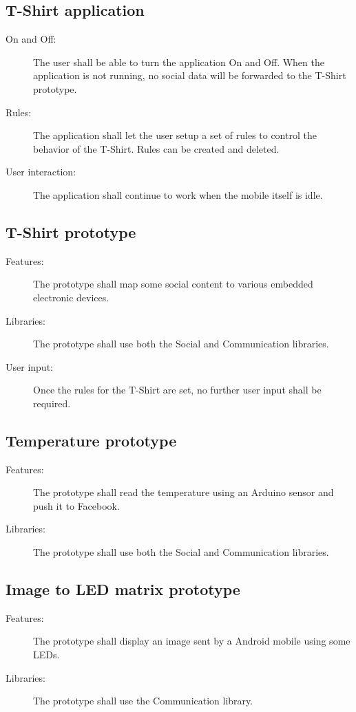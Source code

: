 	\subsection{T-Shirt application}
	
	\begin{description}
		\item[On and Off:] The user shall be able to turn the application On and Off.
		When the application is not running, no social data will be forwarded
		to the T-Shirt prototype.
		\item[Rules:] The application shall let the user setup a set of rules
		to control the behavior of the T-Shirt. Rules can be created and deleted.
		\item[User interaction:] The application shall continue to work
		when the mobile itself is idle.
	\end{description}

	\newpage

	\subsection{T-Shirt prototype}

	\begin{description}
		\item[Features:] The prototype shall map some social content
		to various embedded electronic devices.
		\item[Libraries:] The prototype shall use both the Social and
		Communication libraries.
		\item[User input:] Once the rules for the T-Shirt are set,
		no further user input shall be required.
	\end{description}

	\subsection{Temperature prototype}
	\begin{description}
		\item[Features:] The prototype shall read the temperature
		using an Arduino sensor and push it to Facebook.
		\item[Libraries:] The prototype shall use both the Social and
		Communication libraries.
		\item[]
	\end{description}
	
	\subsection{Image to LED matrix prototype}
	\begin{description}
		\item[Features:] The prototype shall display an image sent by a Android
		mobile using some LEDs.
		\item[Libraries:] The prototype shall use the Communication library.
		\item[]
	\end{description}

